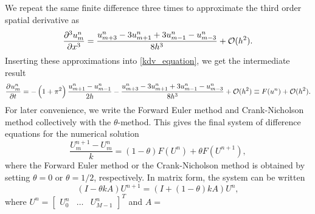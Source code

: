 We repeat the same finite difference three times to approximate the third order spatial derivative as 
\begin{equation*}
	\dpd[3]{u_m^n}{x} = \frac{u_{m+3}^n-3u_{m+1}^n+3u_{m-1}^n-u_{m-3}^n}{8 h^3} + \Oh(h^2).
\end{equation*}
Inserting these approximations into \cref{kdv_equation}, we get the intermediate result
\begin{equation*}
	\dpd{u_m^n}{t} = -\left(1+\pi^2\right) \frac{u_{m+1}^n-u_{m-1}^n}{2 h} - \frac{u_{m+3}^n-3u_{m+1}^n+3u_{m-1}^n-u_{m-3}^n}{8 h^3} + \Oh(h^2) \equiv F(u^n) + \Oh(h^2).
\end{equation*}
For later convenience, we write the Forward Euler method and Crank-Nicholson method collectively with the $\theta$-method.
This gives the final system of difference equations for the numerical solution
\begin{equation}\label{theta_method_discretized}
	\frac{U_m^{n+1} - U_m^n}{k} = (1-\theta) F(U^n) + \theta F(U^{n+1}),
\end{equation}
where the Forward Euler method or the Crank-Nicholson method is obtained by setting $\theta = 0$ or $\theta = 1/2$, respectively.
In matrix form, the system can be written
\begin{equation}
	\left(I - \theta k A\right) U^{n+1} = \left(I + \left(1-\theta\right) k A\right) U^n,
	\label{matrixeq}
\end{equation}
where $U^{n} = \begin{bmatrix} U_0^n & \dots & U_{M-1}^n \end{bmatrix}^T$ and $A = $
\newcommand\ca{\color{red}}
\newcommand\cb{\color{magenta}}
\newcommand\cc{\color{blue}}
\newcommand\cd{\color{cyan}}
